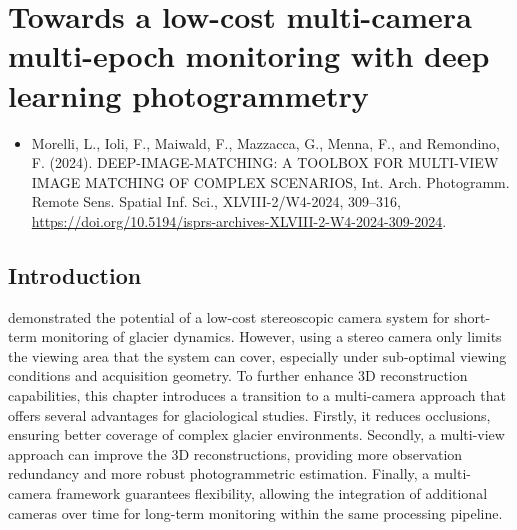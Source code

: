 \graphicspath{{figures/chapter5/}}
\onehalfspacing

\chapter{Towards a low-cost multi-camera multi-epoch monitoring with deep learning photogrammetry}\label{ch:5}

\vfill


\begin{itemize}
  \item Morelli, L., Ioli, F., Maiwald, F., Mazzacca, G., Menna, F., and Remondino, F. (2024). DEEP-IMAGE-MATCHING: A TOOLBOX FOR MULTI-VIEW IMAGE MATCHING OF COMPLEX SCENARIOS, Int. Arch. Photogramm. Remote Sens. Spatial Inf. Sci., XLVIII-2/W4-2024, 309–316, \url{https://doi.org/10.5194/isprs-archives-XLVIII-2-W4-2024-309-2024}. 
\end{itemize}

\newpage

\section{Introduction}\label{sec:5:intro}


 demonstrated the potential of a low-cost stereoscopic camera system for short-term monitoring of glacier dynamics. 
However, using a stereo camera only limits the viewing area that the system can cover, especially under sub-optimal viewing conditions and acquisition geometry.
To further enhance 3D reconstruction capabilities, this chapter introduces a transition to a multi-camera approach that offers several advantages for glaciological studies.  
Firstly, it reduces occlusions, ensuring better coverage of complex glacier environments. 
Secondly, a multi-view approach can improve the 3D reconstructions, providing more observation redundancy and more robust photogrammetric estimation.
Finally, a multi-camera framework guarantees flexibility, allowing the integration of additional cameras over time for long-term monitoring within the same processing pipeline. 

